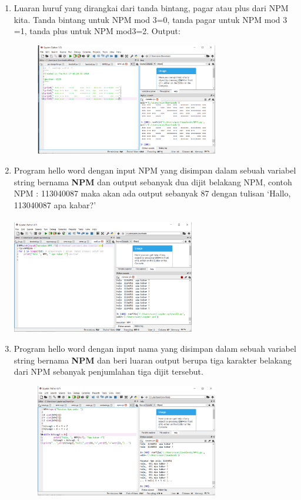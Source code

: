 \begin{enumerate}
\item
Luaran huruf yang dirangkai dari tanda bintang, pagar atau plus dari NPM kita.
Tanda bintang untuk NPM mod 3=0, tanda pagar untuk NPM mod 3 =1, tanda plus untuk NPM mod3=2.
Output:
\begin{figure}[h]
\centerline{\includegraphics[width=8cm]{figures/NPM11.PNG}}
\end{figure}


\item
Program hello word dengan input NPM yang disimpan dalam sebuah variabel string bernama \textbf{NPM} dan output sebanyak dua dijit belakang NPM, 
contoh NPM : 113040087 maka akan ada output sebanyak 87 dengan tulisan `Hallo, 113040087 apa kabar?'
\paragraph{}
\centerline{\includegraphics[width=8cm]{figures/soal2.PNG}}


\item
Program hello word dengan input nama yang disimpan dalam sebuah variabel string bernama \textbf{NPM} dan beri luaran output berupa tiga karakter belakang dari NPM sebanyak penjumlahan tiga dijit tersebut.
\begin{figure}[h]
\centerline{\includegraphics[width=8cm]{figures/npm3.PNG}}
\end{figure}



\end{enumerate}

